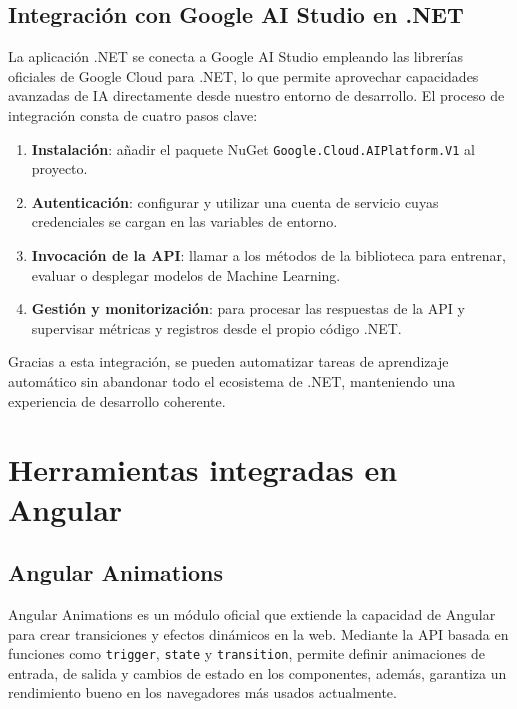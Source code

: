 
\subsection{Integración con Google AI Studio en .NET}

La aplicación .NET se conecta a Google AI Studio empleando las librerías oficiales de Google Cloud para .NET, lo que permite aprovechar capacidades avanzadas de IA directamente desde nuestro entorno de desarrollo. El proceso de integración consta de cuatro pasos clave:

\begin{enumerate}
  \item \textbf{Instalación}: añadir el paquete NuGet  
    \texttt{Google.Cloud.AIPlatform.V1} al proyecto.
  \item \textbf{Autenticación}: configurar y utilizar una cuenta de servicio  
    cuyas credenciales se cargan en las variables de entorno.
  \item \textbf{Invocación de la API}: llamar a los métodos de la biblioteca  
    para entrenar, evaluar o desplegar modelos de Machine Learning.
  \item \textbf{Gestión y monitorización}: para procesar las respuestas de la API y supervisar métricas y registros desde el propio código .NET.
\end{enumerate}

Gracias a esta integración, se pueden automatizar tareas de aprendizaje automático sin abandonar todo el ecosistema de .NET, manteniendo una experiencia de desarrollo coherente.


\section{Herramientas integradas en Angular}

\subsection{Angular Animations}
Angular Animations es un módulo oficial que extiende la capacidad de Angular para crear transiciones y efectos dinámicos en la web. Mediante la API basada en funciones como \texttt{trigger}, \texttt{state} y \texttt{transition}, permite definir animaciones de entrada, de salida y cambios de estado en los componentes, además, garantiza un rendimiento bueno en los navegadores más usados actualmente.

